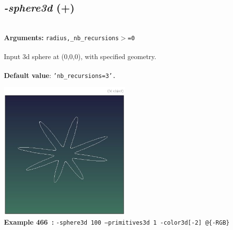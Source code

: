 \documentclass[a4paper,11pt,twoside]{book}
\begin{document}
\subsection{\emph{-sphere3d} (+)}\vspace*{-0.5em}
~\\\textbf{Arguments: } 
{\small \texttt{radius,\_nb\_recursions$>$=0}}\\~\\
Input 3d sphere at (0,0,0), with specified geometry.
~\\~\\\textbf{Default value}: {\small \texttt{'nb\_recursions=3'.}}
\begin{center}\includegraphics[keepaspectratio=true,height=7cm,width=\textwidth]{img/gmic_def466.jpg}\\
{\footnotesize \textbf{Example 466~:} \texttt{-sphere3d 100 --primitives3d 1  -color3d[-2] @\{-RGB\}}}
\end{center}
\end{document}
